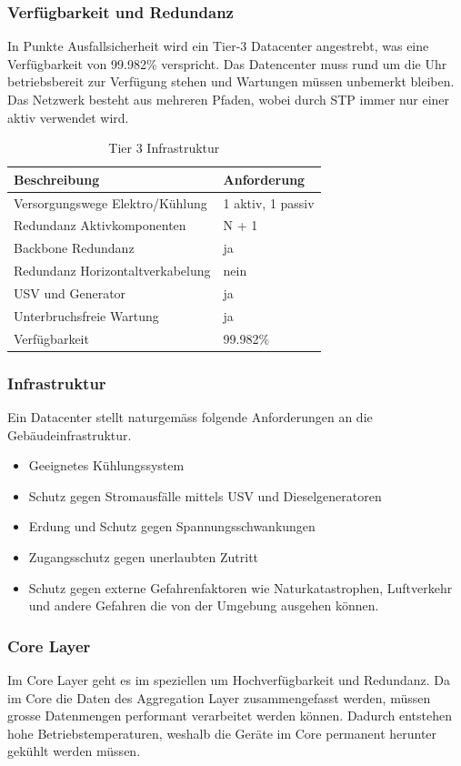 \subsubsection{Verfügbarkeit und Redundanz}
In Punkte Ausfallsicherheit wird ein Tier-3 Datacenter angestrebt, was eine Verfügbarkeit von 99.982\% verspricht. Das Datencenter muss rund um die Uhr betriebsbereit zur Verfügung stehen und Wartungen müssen unbemerkt bleiben. Das Netzwerk besteht aus mehreren Pfaden, wobei durch STP immer nur einer aktiv verwendet wird.  
\begin{table}[h]
	\centering
	\begin{tabu}{l l}
		\toprule
		Beschreibung & Anforderung \\
		\midrule
		Versorgungswege Elektro/Kühlung & 1 aktiv, 1 passiv \\
		Redundanz Aktivkomponenten & N + 1 \\
		Backbone Redundanz & ja\\
		Redundanz Horizontaltverkabelung & nein\\
		USV und Generator & ja\\
		Unterbruchsfreie Wartung & ja\\
		Verfügbarkeit & 99.982\% \\
		\bottomrule
	\end{tabu}
	\caption{Tier 3 Infrastruktur}
\end{table}

\subsubsection{Infrastruktur}
Ein Datacenter stellt naturgemäss folgende Anforderungen an die Gebäudeinfrastruktur.
\begin{itemize}
	\item Geeignetes Kühlungssystem
	\item Schutz gegen Stromausfälle mittels USV und Dieselgeneratoren
	\item Erdung und Schutz gegen Spannungsschwankungen
	\item Zugangsschutz gegen unerlaubten Zutritt
	\item Schutz gegen externe Gefahrenfaktoren wie Naturkatastrophen, Luftverkehr und andere Gefahren die von der Umgebung ausgehen können.
\end{itemize}

\subsubsection{Core Layer}
Im Core Layer geht es im speziellen um Hochverfügbarkeit und Redundanz. Da im Core die Daten des Aggregation Layer zusammengefasst werden, müssen grosse Datenmengen performant verarbeitet werden können. Dadurch entstehen hohe Betriebstemperaturen, weshalb die Geräte im Core permanent herunter gekühlt werden müssen.

